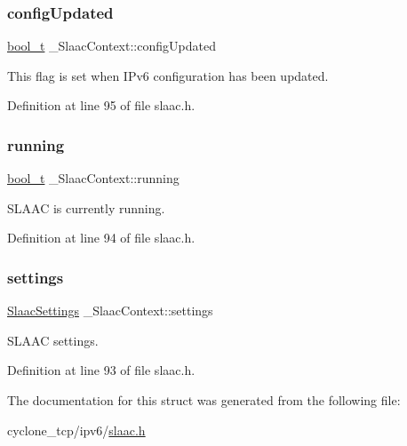 \subsubsection{\texorpdfstring{config\+Updated}{configUpdated}}
{\footnotesize\ttfamily \hyperlink{compiler__port_8h_a812d16e5494522586b3784e55d479912}{bool\+\_\+t} \+\_\+\+Slaac\+Context\+::config\+Updated}



This flag is set when I\+Pv6 configuration has been updated. 



Definition at line 95 of file slaac.\+h.

\mbox{\label{struct__SlaacContext_a832afcbfe7a7fec6b5f89f060471af92}} 
\subsubsection{\texorpdfstring{running}{running}}
{\footnotesize\ttfamily \hyperlink{compiler__port_8h_a812d16e5494522586b3784e55d479912}{bool\+\_\+t} \+\_\+\+Slaac\+Context\+::running}



S\+L\+A\+AC is currently running. 



Definition at line 94 of file slaac.\+h.

\mbox{\label{struct__SlaacContext_a6ba3eb35da0958f9a4d2efd9b8fcf9bc}} 
\subsubsection{\texorpdfstring{settings}{settings}}
{\footnotesize\ttfamily \hyperlink{structSlaacSettings}{Slaac\+Settings} \+\_\+\+Slaac\+Context\+::settings}



S\+L\+A\+AC settings. 



Definition at line 93 of file slaac.\+h.



The documentation for this struct was generated from the following file\+:\begin{DoxyCompactItemize}
\item 
cyclone\+\_\+tcp/ipv6/\hyperlink{slaac_8h}{slaac.\+h}\end{DoxyCompactItemize}
